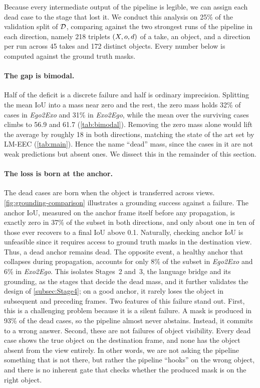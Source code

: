 Because every intermediate output of the pipeline is legible, we can assign each dead case to the stage that lost it. We conduct this analysis on 25\% of the validation split of $\mathcal{D}$, comparing against the two strongest runs of the pipeline in each direction, namely 218 triplets $(X, o, d)$ of a take, an object, and a direction per run across 45 takes and 172 distinct objects. Every number below is computed against the ground truth masks.

\paragraph{The gap is bimodal.}
\label{subsec:bimodal}

Half of the deficit is a discrete failure and half is ordinary imprecision. Splitting the mean IoU into a mass near zero and the rest, the zero mass holds 32\% of cases in \textit{Ego2Exo} and 31\% in \textit{Exo2Ego}, while the mean over the surviving cases climbs to 56.9 and 61.7 (\cref{tab:bimodal}). Removing the zero mass alone would lift the average by roughly 18 in both directions, matching the state of the art set by LM-EEC (\cref{tab:main}). Hence the name ``dead'' mass, since the cases in it are not weak predictions but absent ones. We dissect this in the remainder of this section.

\paragraph{The loss is born at the anchor.}
\label{subsec:born-at-anchor}

The dead cases are born when the object is transferred across views. \cref{fig:grounding-comparison} illustrates a grounding success against a failure. The anchor IoU, measured on the anchor frame itself before any propagation, is exactly zero in 37\% of the subset in both directions, and only about one in ten of those ever recovers to a final IoU above 0.1. Naturally, checking anchor IoU is unfeasible since it requires access to ground truth masks in the destination view. Thus, a dead anchor remains dead. The opposite event, a healthy anchor that collapses during propagation, accounts for only 8\% of the subset in \textit{Ego2Exo} and 6\% in \textit{Exo2Ego}. This isolates Stages~2 and~3, the language bridge and its grounding, as the stages that decide the dead mass, and it further validates the design of \cref{subsec:Stage4}; on a good anchor, it rarely loses the object in subsequent and preceding frames. Two features of this failure stand out. First, this is a challenging problem because it is a silent failure. A mask is produced in 93\% of the dead cases, so the pipeline almost never abstains. Instead, it commits to a wrong answer. Second, these are not failures of object visibility. Every dead case shows the true object on the destination frame, and none has the object absent from the view entirely. In other words, we are not asking the pipeline something that is not there, but rather the pipeline ``hooks'' on the wrong object, and there is no inherent gate that checks whether the produced mask is on the right object.

